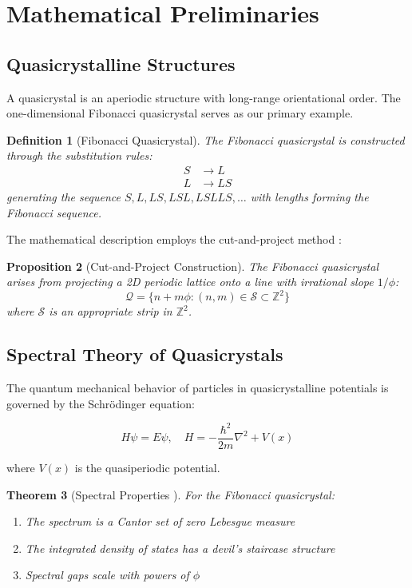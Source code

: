 \documentclass[12pt]{article}
\newtheorem{theorem}{Theorem}[section]
\newtheorem{proposition}[theorem]{Proposition}
\newtheorem{definition}[theorem]{Definition}
\newcommand{\Z}{\mathbb{Z}}
\begin{document}
\section{Mathematical Preliminaries}

\subsection{Quasicrystalline Structures}

A quasicrystal is an aperiodic structure with long-range orientational order. The one-dimensional Fibonacci quasicrystal serves as our primary example.

\begin{definition}[Fibonacci Quasicrystal]
The Fibonacci quasicrystal is constructed through the substitution rules:
\begin{align}
S &\to L \\
L &\to LS
\end{align}
generating the sequence $S, L, LS, LSL, LSLLS, \ldots$ with lengths forming the Fibonacci sequence.
\end{definition}

The mathematical description employs the cut-and-project method \cite{duneau1985}:

\begin{proposition}[Cut-and-Project Construction]
The Fibonacci quasicrystal arises from projecting a 2D periodic lattice onto a line with irrational slope $1/\phi$:
\begin{equation}
\mathcal{Q} = \{n + m\phi : (n,m) \in \mathcal{S} \subset \Z^2\}
\end{equation}
where $\mathcal{S}$ is an appropriate strip in $\Z^2$.
\end{proposition}

\subsection{Spectral Theory of Quasicrystals}

The quantum mechanical behavior of particles in quasicrystalline potentials is governed by the Schrödinger equation:

\begin{equation}
H\psi = E\psi, \quad H = -\frac{\hbar^2}{2m}\nabla^2 + V(x)
\end{equation}

where $V(x)$ is the quasiperiodic potential.

\begin{theorem}[Spectral Properties \cite{suto1989}]
For the Fibonacci quasicrystal:
\begin{enumerate}
\item The spectrum is a Cantor set of zero Lebesgue measure
\item The integrated density of states has a devil's staircase structure
\item Spectral gaps scale with powers of $\phi$
\end{enumerate}
\end{theorem}
\end{document}
